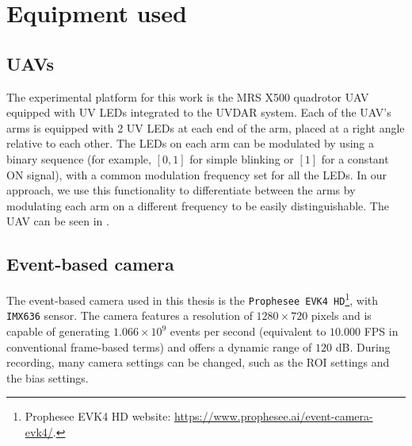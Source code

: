 \section{Equipment used}

\subsection{UAVs}
The experimental platform for this work is the MRS X500\cite{hertmrs} quadrotor \ac{UAV} equipped with \ac{UV} \ac{LED}s
integrated to the UVDAR\cite{walteruvdar} system.
Each of the \ac{UAV}'s arms is equipped with 2 \ac{UV} \ac{LED}s at each end of the arm, placed at a right angle relative to each other.
The \ac{LED}s on each arm can be modulated
by using a binary sequence (for example, $[0, 1]$ for simple blinking or $[1]$ for a constant ON signal), with a common modulation frequency set for all the \ac{LED}s.
In our approach, we use this functionality to differentiate between the arms by modulating each arm on a different frequency to be easily distinguishable.
The \ac{UAV} can be seen in .

\subsection{Event-based camera}
The event-based camera used in this thesis is the \texttt{Prophesee EVK4 HD}\footnote{Prophesee EVK4 HD website: \url{https://www.prophesee.ai/event-camera-evk4/}.},
with \texttt{IMX636} sensor. The camera features a resolution of $1280 \times 720$ pixels and is capable of generating $1.066\times10^9$ events per second (equivalent to $10.000$ \ac{FPS} in conventional frame-based terms) and offers a dynamic range of $120$ dB.
During recording, many camera settings can be changed, such as the \ac{ROI} settings and the bias settings.

